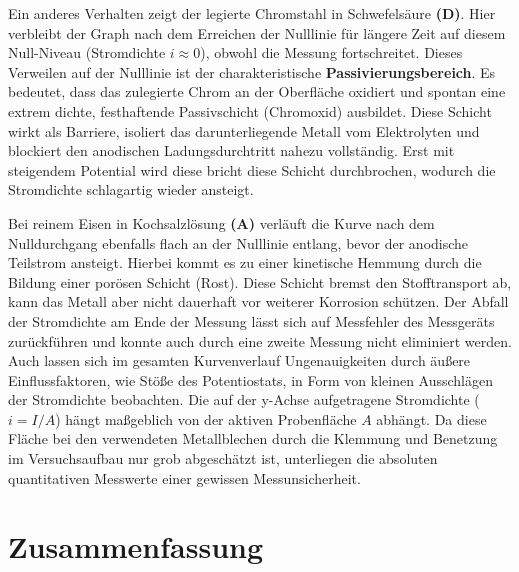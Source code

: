 \documentclass[11pt,a4paper]{article}
\numberwithin{equation}{section}
\begin{document}
\noindent Ein anderes Verhalten zeigt der legierte Chromstahl in Schwefelsäure \textbf{(D)}. Hier verbleibt der Graph nach dem Erreichen der Nulllinie für längere Zeit auf diesem Null-Niveau (Stromdichte $i \approx 0$), obwohl die Messung fortschreitet. Dieses Verweilen auf der Nulllinie ist der charakteristische \textbf{Passivierungsbereich}. Es bedeutet, dass das zulegierte Chrom an der Oberfl\"ache oxidiert und spontan eine extrem dichte, festhaftende Passivschicht (Chromoxid) ausbildet. Diese Schicht wirkt als Barriere, isoliert das darunterliegende Metall vom Elektrolyten und blockiert den anodischen Ladungsdurchtritt nahezu vollständig. Erst mit steigendem Potential wird diese bricht diese Schicht durchbrochen, wodurch die Stromdichte schlagartig wieder ansteigt.

\noindent Bei reinem Eisen in Kochsalzlösung \textbf{(A)} verläuft die Kurve nach dem Nulldurchgang ebenfalls flach an der Nulllinie entlang, bevor der anodische Teilstrom ansteigt. Hierbei kommt es zu einer kinetische Hemmung durch die Bildung einer porösen Schicht (Rost). Diese Schicht bremst den Stofftransport ab, kann das Metall aber nicht dauerhaft vor weiterer Korrosion schützen. Der Abfall der Stromdichte am Ende der Messung l\"asst sich auf Messfehler des Messger\"ats zur\"uckf\"uhren und konnte auch durch eine zweite Messung nicht eliminiert werden.
\noindent Auch lassen sich im gesamten Kurvenverlauf Ungenauigkeiten durch \"au{\ss}ere Einflussfaktoren, wie St\"o{\ss}e des Potentiostats, in Form von kleinen Ausschl\"agen der Stromdichte beobachten.
\noindent Die auf der y-Achse aufgetragene Stromdichte ($i = I/A$) h\"angt maßgeblich von der aktiven Probenfläche $A$ abhängt. Da diese Fläche bei den verwendeten Metallblechen durch die Klemmung und Benetzung im Versuchsaufbau nur grob abgeschätzt ist, unterliegen die absoluten quantitativen Messwerte einer gewissen Messunsicherheit.

%

\newpage
\section{Zusammenfassung}
\end{document}
